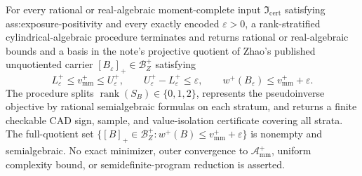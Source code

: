 For every rational or real-algebraic moment-complete input \(\mathfrak I_{\mathrm{cert}}\) satisfying ass:exposure-positivity and every exactly encoded \(\varepsilon>0\), a rank-stratified cylindrical-algebraic procedure terminates and returns rational or real-algebraic bounds and a basis in the note's projective quotient of Zhao's published unquotiented carrier \([B_\varepsilon]_+\in\mathcal B_Z^+\) satisfying
\[
L_\varepsilon^+\le v_{\mathrm{mm}}^+\le U_\varepsilon^+,
\qquad U_\varepsilon^+-L_\varepsilon^+\le\varepsilon,
\qquad w^+(B_\varepsilon)\le v_{\mathrm{mm}}^++\varepsilon.
\]
The procedure splits \(\operatorname{rank}(S_B)\in\{0,1,2\}\), represents the pseudoinverse objective by rational semialgebraic formulas on each stratum, and returns a finite checkable CAD sign, sample, and value-isolation certificate covering all strata.  The full-quotient set \(\{[B]_+\in\mathcal B_Z^+:w^+(B)\le v_{\mathrm{mm}}^++\varepsilon\}\) is nonempty and semialgebraic.  No exact minimizer, outer convergence to \(\mathcal A_{\mathrm{mm}}^+\), uniform complexity bound, or semidefinite-program reduction is asserted.